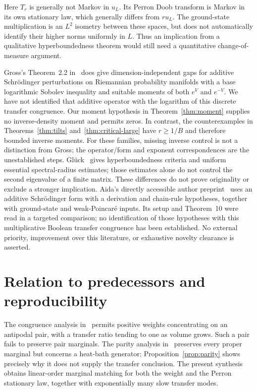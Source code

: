 \documentclass[11pt]{article}
\begin{document}
Here $T_r$ is generally not Markov in $u_L$. Its Perron Doob transform
is Markov in its own stationary law, which generally differs from $r u_L$.
The ground-state multiplication is an $L^2$ isometry between these spaces,
but does not automatically identify their higher norms uniformly in $L$.
Thus an implication from a qualitative hyperboundedness theorem would
still need a quantitative change-of-measure argument.

Gross's Theorem~2.2 in~\cite{Gross} does give dimension-independent gaps
for additive Schr\"odinger perturbations on Riemannian probability
manifolds with a base logarithmic Sobolev inequality and suitable moments
of both $e^V$ and $e^{-V}$. We have not identified that additive operator
with the logarithm of this discrete transfer congruence. Our moment
hypothesis in Theorem~\ref{thm:moment} supplies no inverse-density moment
and permits zeros. In contrast, the counterexamples in
Theorems~\ref{thm:tilts} and~\ref{thm:critical-large} have $r\ge1/B$ and therefore bounded inverse
moments. For these families, missing inverse control is not a distinction
from Gross; the operator/form and exponent correspondences are the
unestablished steps.
Gl\"uck~\cite{Gluck} gives hyperboundedness criteria and uniform essential
spectral-radius estimates; those estimates alone do not control the
second eigenvalue of a finite matrix. These differences do not prove
originality or exclude a stronger implication. Aida's directly accessible author preprint~\cite{Aida}
uses an additive Schr\"odinger form with a derivation and chain-rule
hypotheses, together with ground-state and weak-Poincar\'e inputs.
Its setup and Theorem~10 were read in a targeted comparison; no
identification of those hypotheses with this multiplicative Boolean
transfer congruence has been established. No external priority, improvement over this literature, or exhaustive
novelty clearance is asserted.

\section{Relation to predecessors and reproducibility}
The congruence analysis in~\cite{ErikssonCongruence} permits positive
weights concentrating on an antipodal pair, with a transfer ratio tending
to one as volume grows. Such a pair fails to preserve pair marginals.
The parity analysis in~\cite{ErikssonParity} preserves every proper
marginal but concerns a heat-bath generator; Proposition~\ref{prop:parity}
shows precisely why it does not supply the transfer conclusion.
The present synthesis obtains linear-order marginal matching for both
the weight and the Perron stationary law, together with exponentially
many slow transfer modes.
\end{document}
